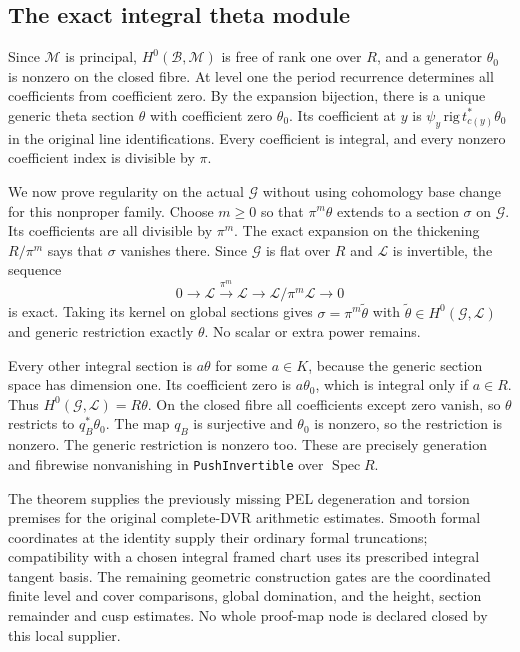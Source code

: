 \subsection*{The exact integral theta module}

Since $\mathscr M$ is principal, $H^0(\mathcal B,\mathscr M)$ is
free of rank one over $R$, and a generator $\theta_0$ is nonzero on
the closed fibre.  At level one the period recurrence determines all
coefficients from coefficient zero.  By the expansion bijection,
there is a unique generic theta section $\theta$ with coefficient
zero $\theta_0$.  Its coefficient at $y$ is
$\psi_y\,\mathrm{rig}\,t_{c(y)}^*\theta_0$ in the original line
identifications.  Every coefficient is integral, and every nonzero
coefficient index is divisible by $\pi$.

We now prove regularity on the actual $\mathcal G$ without using
cohomology base change for this nonproper family.  Choose $m\geq0$
so that $\pi^m\theta$ extends to a section $\sigma$ on
$\mathcal G$.  Its coefficients are all divisible by $\pi^m$.
The exact expansion on the thickening $R/\pi^m$ says that $\sigma$
vanishes there.  Since $\mathcal G$ is flat over $R$ and
$\mathscr L$ is invertible, the sequence
\[
 0\longrightarrow\mathscr L\xrightarrow{\pi^m}\mathscr L
        \longrightarrow\mathscr L/\pi^m\mathscr L\longrightarrow0
\]
is exact.  Taking its kernel on global sections gives
$\sigma=\pi^m\widetilde\theta$ with
$\widetilde\theta\in H^0(\mathcal G,\mathscr L)$ and generic
restriction exactly $\theta$.  No scalar or extra power remains.

Every other integral section is $a\theta$ for some $a\in K$,
because the generic section space has dimension one.  Its coefficient
zero is $a\theta_0$, which is integral only if $a\in R$.
Thus $H^0(\mathcal G,\mathscr L)=R\theta$.  On the closed fibre all
coefficients except zero vanish, so $\theta$ restricts to
$q_B^*\theta_0$.  The map $q_B$ is surjective and $\theta_0$ is
nonzero, so the restriction is nonzero.  The generic restriction is
nonzero too.  These are precisely generation and fibrewise
nonvanishing in \texttt{PushInvertible} over $\operatorname{Spec}R$.

The theorem supplies the previously missing PEL degeneration and
torsion premises for the original complete-DVR arithmetic estimates.
Smooth formal coordinates at the identity supply their ordinary
formal truncations; compatibility with a chosen integral framed
chart uses its prescribed integral tangent basis.  The remaining
geometric construction gates are the coordinated finite level and
cover comparisons, global domination, and the height, section
remainder and cusp estimates.  No whole proof-map
node is declared closed by this local supplier.
